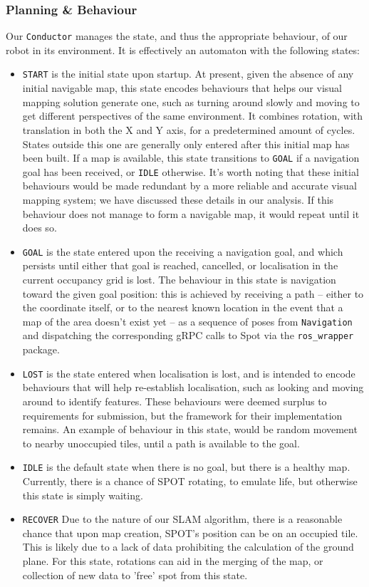 \documentclass[10pt,english]{article}
\begin{document}
\subsubsection*{Planning \& Behaviour}

Our \texttt{Conductor} manages the state, and thus the appropriate behaviour, of our robot in its environment. It is effectively an automaton with the following states:

\begin{itemize}[noitemsep]
    \item \texttt{START} is the initial state upon startup. At present, given the absence of any initial navigable map, this state encodes behaviours that helps our visual mapping solution generate one, such as turning around slowly and moving to get different perspectives of the same environment. It combines rotation, with translation in both the X and Y axis, for a predetermined amount of cycles. States outside this one are generally only entered after this initial map has been built. If a map is available, this state transitions to \texttt{GOAL} if a navigation goal has been received, or \texttt{IDLE} otherwise. It's worth noting that these initial behaviours would be made redundant by a more reliable and accurate visual mapping system; we have discussed these details in our analysis. If this behaviour does not manage to form a navigable map, it would repeat until it does so.
    \item \texttt{GOAL} is the state entered upon the receiving a navigation goal, and which persists until either that goal is reached, cancelled, or localisation in the current occupancy grid is lost. The behaviour in this state is navigation toward the given goal position: this is achieved by receiving a path -- either to the coordinate itself, or to the nearest known location in the event that a map of the area doesn't exist yet -- as a sequence of poses from \texttt{Navigation} and dispatching the corresponding gRPC calls to Spot via the \texttt{ros\_wrapper} package.
    \item \texttt{LOST} is the state entered when localisation is lost, and is intended to encode behaviours that will help re-establish localisation, such as looking and moving around to identify features. These behaviours were deemed surplus to requirements for submission, but the framework for their implementation remains. An example of behaviour in this state, would be random movement to nearby unoccupied tiles, until a path is available to the goal.
    \item \texttt{IDLE} is the default state when there is no goal, but there is a healthy map. Currently, there is a chance of SPOT rotating, to emulate life, but otherwise this state is simply waiting.
    \item \texttt{RECOVER} Due to the nature of our SLAM algorithm, there is a reasonable chance that upon map creation, SPOT's position can be on an occupied tile. This is likely due to a lack of data prohibiting the calculation of the ground plane. For this state, rotations can aid in the merging of the map, or collection of new data to 'free' spot from this state.
\end{itemize}
\end{document}
